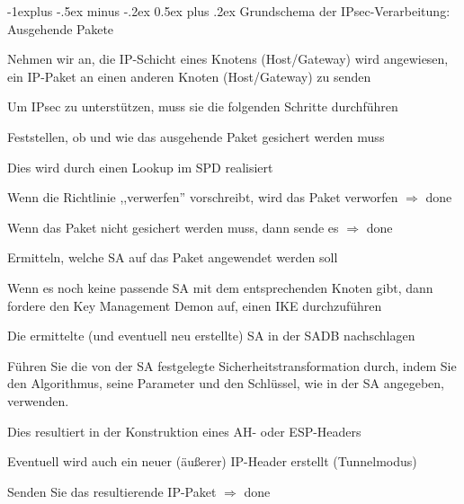 \documentclass[a4paper]{article}
\makeatletter
\renewcommand{\subsection}{\@startsection{subsection}{2}{0mm}%
 {-1explus -.5ex minus -.2ex}%
 {0.5ex plus .2ex}%
 {\normalfont\normalsize\bfseries}}
\makeatother
\begin{document}
\begin{multicols}{3}
      \subsection{Grundschema der IPsec-Verarbeitung: Ausgehende Pakete}
      \begin{itemize*}
            \item Nehmen wir an, die IP-Schicht eines Knotens (Host/Gateway) wird angewiesen, ein IP-Paket an einen anderen Knoten (Host/Gateway) zu senden
            \item Um IPsec zu unterstützen, muss sie die folgenden Schritte durchführen
            \item Feststellen, ob und wie das ausgehende Paket gesichert werden muss
            \begin{itemize*}
                  \item Dies wird durch einen Lookup im SPD realisiert
                  \item Wenn die Richtlinie ,,verwerfen'' vorschreibt, wird das Paket verworfen $\Rightarrow$ done
                  \item Wenn das Paket nicht gesichert werden muss, dann sende es $\Rightarrow$ done
            \end{itemize*}
            \item Ermitteln, welche SA auf das Paket angewendet werden soll
            \begin{itemize*}
                  \item Wenn es noch keine passende SA mit dem entsprechenden Knoten gibt, dann fordere den Key Management Demon auf, einen IKE durchzuführen
            \end{itemize*}
            \item Die ermittelte (und eventuell neu erstellte) SA in der SADB nachschlagen
            \item Führen Sie die von der SA festgelegte Sicherheitstransformation durch, indem Sie den Algorithmus, seine Parameter und den Schlüssel, wie in der SA angegeben, verwenden.
            \begin{itemize*}
                  \item Dies resultiert in der Konstruktion eines AH- oder ESP-Headers
                  \item Eventuell wird auch ein neuer (äußerer) IP-Header erstellt (Tunnelmodus)
            \end{itemize*}
            \item Senden Sie das resultierende IP-Paket $\Rightarrow$ done
      \end{itemize*}


\end{multicols}
\end{document}
